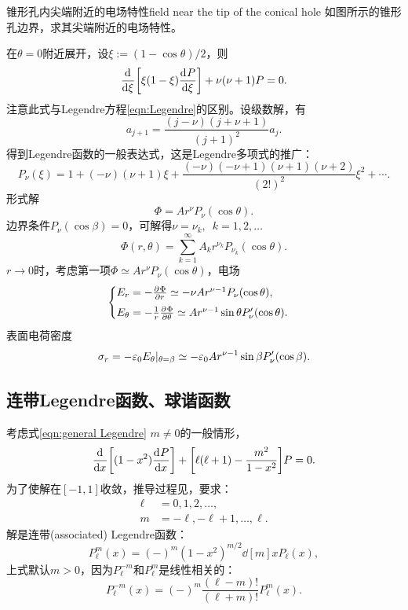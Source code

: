 \begin{example}{锥形孔内尖端附近的电场特性}{field near the tip of the conical hole}
    如图所示的锥形孔边界，求其尖端附近的电场特性。
    \begin{notecaptionblock}
        \label{fig:conical hole}
    \end{notecaptionblock}
    在$\theta = 0$附近展开，设$\xi := (1 - \cos\theta)/2$，则
    \[
        \frac{\mathop{}\!\mathrm{d}^{}}{\mathrm{d}{\xi}^{}}\biggl[\xi(1 - \xi)\frac{\mathop{}\!\mathrm{d}^{}P}{\mathrm{d}{\xi}^{}}\biggr] + \nu(\nu + 1)P = 0.
    \]
    注意此式与Legendre方程\eqref{eqn:Legendre}的区别。设级数解，有
    \[
        a_{j+1} = \frac{(j - \nu)(j + \nu + 1)}{(j + 1)^2}a_j.
    \]
    得到Legendre函数的一般表达式，这是Legendre多项式的推广：
    \[
        P_\nu(\xi) = 1 + (-\nu)(\nu + 1)\xi + \frac{(-\nu)(-\nu + 1)(\nu + 1)(\nu + 2)}{(2!)^2}\xi^2 + \cdots.
    \]
    形式解
    \[
        \Phi = Ar^\nu P_\nu(\cos\theta).
    \]
    边界条件$P_\nu(\cos\beta) = 0$，可解得$\nu = \nu_k,\enspace k = 1,2,\ldots$
    \[
        \Phi(r,\theta) = \sum_{k=1}^\infty A_kr^{\nu_k}P_{\nu_k}(\cos\theta).
    \]
    $r \to 0$时，考虑第一项$\Phi \simeq Ar^\nu P_\nu(\cos\theta)$，电场
    \[
        \begin{cases}
            E_r = -\frac{\partial^{}\Phi}{\partial{r}^{}} \simeq -\nu Ar^{\nu-1}P_\nu(\cos\theta),\\[1ex]
            E_\theta = -\frac1r\frac{\partial^{}\Phi}{\partial{\theta}^{}} \simeq Ar^{\nu-1}\sin\theta P'_\nu(\cos\theta).
        \end{cases}
    \]
    表面电荷密度
    \[
        \sigma_r = -\varepsilon_0{E_\theta}\rvert_{\theta=\beta} \simeq -\varepsilon_0Ar^{\nu-1}\sin\beta P_\nu'(\cos\beta).
    \]
\end{example}

\subsection{连带Legendre函数、球谐函数}
\label{ssec:associated Legendre function and spherical harmonics}

考虑式\eqref{eqn:general Legendre} $m \neq 0$的一般情形，
\begin{equation}
    \label{eq:ed-associated-legendre-ode}
    \frac{\mathop{}\!\mathrm{d}^{}}{\mathrm{d}{x}^{}}\biggl[(1 - x^2)\frac{\mathop{}\!\mathrm{d}^{}P}{\mathrm{d}{x}^{}}\biggr] + \biggl[\ell(\ell + 1) - \frac{m^2}{1 - x^2}\biggr]P = 0.
\end{equation}
为了使解在$[-1,1]$收敛，推导过程见，要求：
\begin{subequations}
    \begin{align}
        \ell &= 0,1,2,\ldots,\\
        m &= -\ell,-\ell + 1,\ldots,\ell.
    \end{align}
\end{subequations}
解是连带(associated) Legendre函数：
\begin{equation}
    P_\ell^m(x) = (-)^m(1 - x^2)^{m/2}\dd[m]xP_\ell(x),
\end{equation}
上式默认$m > 0$，因为$P_\ell^{-m}$和$P_\ell^m$是线性相关的：
\begin{equation}
    P_\ell^{-m}(x) = (-)^m\frac{(\ell - m)!}{(\ell + m)!}P_\ell^m(x).
\end{equation}

